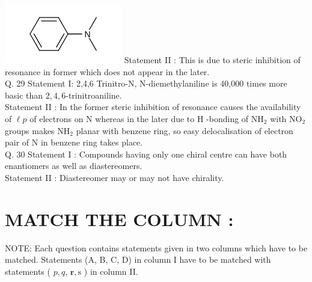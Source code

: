 \documentclass[10pt]{article}
\begin{document}
\includegraphics{smile-2150bb0b1f7170cc9adaa14733c2af6bc6b9864b} Statement II : This is due to steric inhibition of resonance in former which does not appear in the later.\\
Q. 29 Statement I: 2,4,6 Trinitro-N, N-diemethylaniline is 40,000 times more basic than $2,4,6$-trinitroaniline.\\
Statement II : In the former steric inhibition of resonance causes the availability of $\ell p$ of electrons on N whereas in the later due to H -bonding of $\mathrm{NH}_{2}$ with $\mathrm{NO}_{2}$ groups makes $\mathrm{NH}_{2}$ planar with benzene ring, so easy delocalisation of electron pair of N in benzene ring takes place.\\
Q. 30 Statement I : Compounds having only one chiral centre can have both enantiomers as well as diastereomers.\\
Statement II : Diastereomer may or may not have chirality.

\section*{MATCH THE COLUMN :}
NOTE: Each question contains statements given in two columns which have to be matched. Statements (A, B, C, D) in column I have to be matched with statements ( $p, q$, $\mathbf{r}, \mathrm{s}$ ) in column II.
\end{document}
